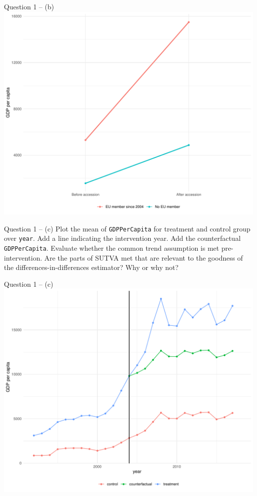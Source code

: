 \documentclass[xcolor=table,dvipsnames]{beamer}
\begin{document}
\begin{frame}{Question 1 -- (b)}
\centering
\includegraphics[scale=0.45]{pictures/week_24_Q1_b.pdf} 
\end{frame}


\begin{frame}{Question 1 -- (c)}
Plot the mean of \texttt{GDPPerCapita} for treatment and control group over \texttt{year}. Add a line indicating the intervention year. Add the counterfactual \texttt{GDPPerCapita}. Evaluate whether the common trend assumption is met pre-intervention. Are the parts of SUTVA met that are relevant to the goodness of the differences-in-differences estimator? Why or why not?
\end{frame}

\begin{frame}{Question 1 -- (c)}
\centering
\includegraphics[scale=0.45]{pictures/week_24_Q1_c.pdf} 
\end{frame}
\end{document}
